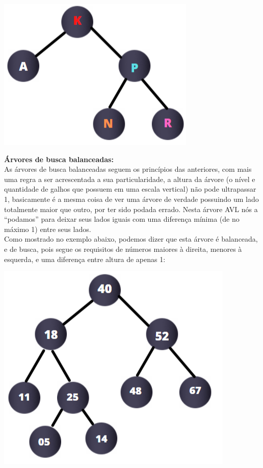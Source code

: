 \documentclass[11pt]{article} %
\begin{document}
\begin{enumerate}[a)]
		\begin{center}
			\includegraphics[scale = 0.7]{q1a2.png}
		\end{center}
	
	
	{\bf Árvores de busca balanceadas:} \\
	\hspace*{1cm}  As árvores de busca balanceadas seguem os princípios das anteriores, com mais uma regra a ser acrescentada a sua particularidade, a altura da árvore (o nível e quantidade de galhos que possuem em uma escala vertical) não pode ultrapassar 1, basicamente é a mesma coisa de ver uma árvore de verdade possuindo um lado totalmente maior que outro, por ter sido podada errado. Nesta árvore AVL nós a “podamos” para deixar seus lados iguais com uma diferença mínima (de no máximo 1) entre seus lados.
	 \\ \hspace*{1cm}Como mostrado no exemplo abaixo, podemos dizer que esta árvore é balanceada, e de busca, pois segue os requisitos de números maiores à direita, menores à esquerda, e uma diferença entre altura de apenas 1:
	
		\begin{center}
			\includegraphics[scale = 0.7]{q1a3.png}
		\end{center}
	

\end{enumerate}
\end{document}
